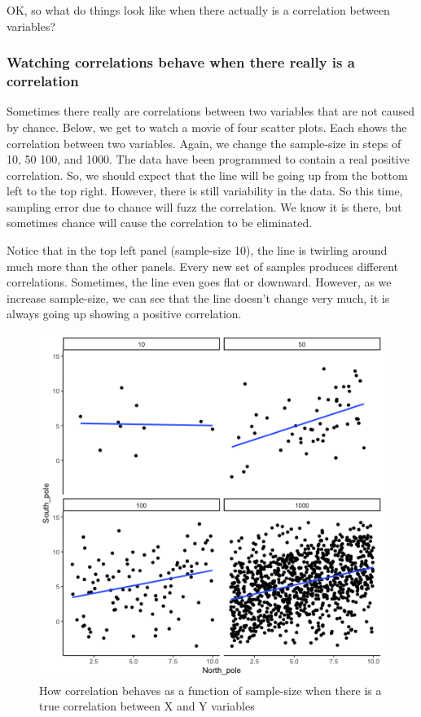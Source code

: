 \documentclass[]{book}
\begin{document}
OK, so what do things look like when there actually is a correlation between variables?

\hypertarget{watching-correlations-behave-when-there-really-is-a-correlation}{%
\subsubsection{Watching correlations behave when there really is a correlation}\label{watching-correlations-behave-when-there-really-is-a-correlation}}

Sometimes there really are correlations between two variables that are not caused by chance. Below, we get to watch a movie of four scatter plots. Each shows the correlation between two variables. Again, we change the sample-size in steps of 10, 50 100, and 1000. The data have been programmed to contain a real positive correlation. So, we should expect that the line will be going up from the bottom left to the top right. However, there is still variability in the data. So this time, sampling error due to chance will fuzz the correlation. We know it is there, but sometimes chance will cause the correlation to be eliminated.

Notice that in the top left panel (sample-size 10), the line is twirling around much more than the other panels. Every new set of samples produces different correlations. Sometimes, the line even goes flat or downward. However, as we increase sample-size, we can see that the line doesn't change very much, it is always going up showing a positive correlation.

\begin{figure}
\centering
\includegraphics{gifs/corRealgif-1.gif}
\caption{\label{fig:3realcorFour}How correlation behaves as a function of sample-size when there is a true correlation between X and Y variables}
\end{figure}
\end{document}
